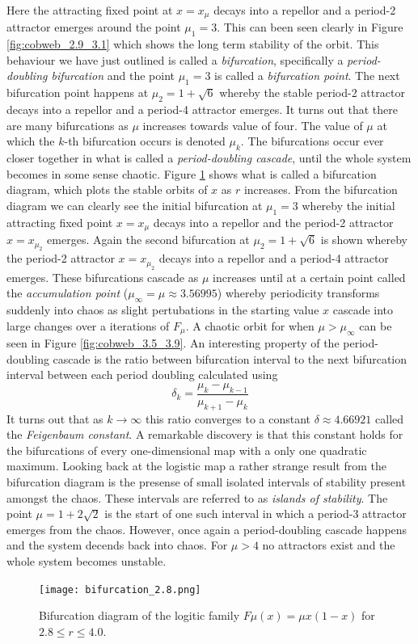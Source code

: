 \documentclass[11pt,a4paper,oneside]{memoir}
\theoremstyle{plain}
\theoremstyle{definition}
\begin{document}
Here the attracting fixed point at $x = x_\mu$ decays into a repellor and a period-2 attractor emerges around the point $\mu_1 = 3$. This can been seen clearly in Figure \ref{fig:cobweb_2.9_3.1} which shows the long term stability of the orbit. This behaviour we have just outlined is called a \emph{bifurcation}, specifically a \emph{period-doubling bifurcation} and the point $\mu_1 = 3$ is called a \emph{bifurcation point}. The next bifurcation point happens at $\mu_2 = 1 + \sqrt{6}$ whereby the stable period-2 attractor decays into a repellor and a period-4 attractor emerges. It turns out that there are many bifurcations as $\mu$ increases towards value of four. The value of $\mu$ at which the $k$-th bifurcation occurs is denoted $\mu_k$. The bifurcations occur ever closer together in what is called a \emph{period-doubling cascade}, until the whole system becomes in some sense chaotic. Figure \ref{fig:bifurcation_2.8} shows what is called a bifurcation diagram, which plots the stable orbits of $x$ as $r$ increases. From the bifurcation diagram we can clearly see the initial bifurcation at $\mu_1 = 3$ whereby the initial attracting fixed point $x = x_\mu$ decays into a repellor and the period-2 attractor $x = x_{\mu_2}$ emerges. Again the second bifurcation at $\mu_2 = 1 + \sqrt{6}$ is shown whereby the period-2 attractor $x = x_{\mu_2}$ decays into a repellor and a period-4 attractor emerges. These bifurcations cascade as $\mu$ increases until at a certain point called the \emph{accumulation point} ($\mu_\infty = \mu \approx 3.56995$) whereby periodicity transforms suddenly into chaos as slight pertubations in the starting value $x$ cascade into large changes over a iterations of $F_\mu$. A chaotic orbit for when $\mu > \mu_\infty$ can be seen in Figure \ref{fig:cobweb_3.5_3.9}. An interesting property of the period-doubling cascade is the ratio between bifurcation interval to the next bifurcation interval between each period doubling calculated using \[\delta_k  = \frac{\mu_k - \mu_{k-1}}{\mu_{k+1}-\mu_k}\]It turns out that as $k \to \infty$ this ratio converges to a constant $\delta \approx 4.66921$ called the \emph{Feigenbaum constant}. A remarkable discovery is that this constant holds for the bifurcations of every one-dimensional map with a only one quadratic maximum. Looking back at the logistic map a rather strange result from the bifurcation diagram is the presense of small isolated intervals of stability present amongst the chaos. These intervals are referred to as \emph{islands of stability}. The point $\mu = 1 + 2\sqrt{2}$ is the start of one such interval in which a period-3 attractor emerges from the chaos. However, once again a period-doubling cascade happens and the system decends back into chaos. For $\mu > 4$ no attractors exist and the whole system becomes unstable.
\begin{figure}[h]
    \centering
    \texttt{[image: bifurcation\_2.8.png]}
    \caption{Bifurcation diagram of the logitic family $F{\mu}(x) = \mu x(1-x)$ for $2.8 \leq r \leq 4.0$.}
    \label{fig:bifurcation_2.8}
\end{figure}
\end{document}

